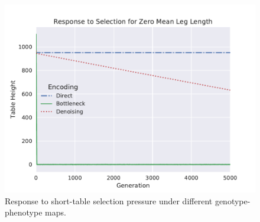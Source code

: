 \begin{figure}
  \includegraphics[width=\linewidth]{img/zero_leg_selection}
  \caption{
    Response to short-table selection pressure under different genotype-phenotype maps.
  }\label{fig:select_response}
\end{figure}
